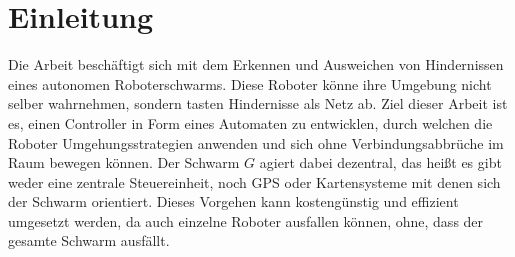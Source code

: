 \section{Einleitung}

Die Arbeit beschäftigt sich mit dem Erkennen und Ausweichen von Hindernissen eines autonomen 
Roboterschwarms. Diese Roboter könne ihre Umgebung nicht selber wahrnehmen, sondern tasten Hindernisse als
Netz ab. Ziel dieser Arbeit ist es, einen Controller in Form eines Automaten zu entwicklen, durch welchen
die Roboter Umgehungsstrategien anwenden und sich ohne Verbindungsabbrüche im Raum bewegen können. Der
Schwarm $G$ agiert dabei dezentral, das heißt es gibt weder eine zentrale Steuereinheit, noch GPS oder 
Kartensysteme mit denen sich der Schwarm orientiert. Dieses Vorgehen kann kostengünstig und effizient
umgesetzt werden, da auch einzelne Roboter ausfallen können, ohne, dass der gesamte Schwarm ausfällt.